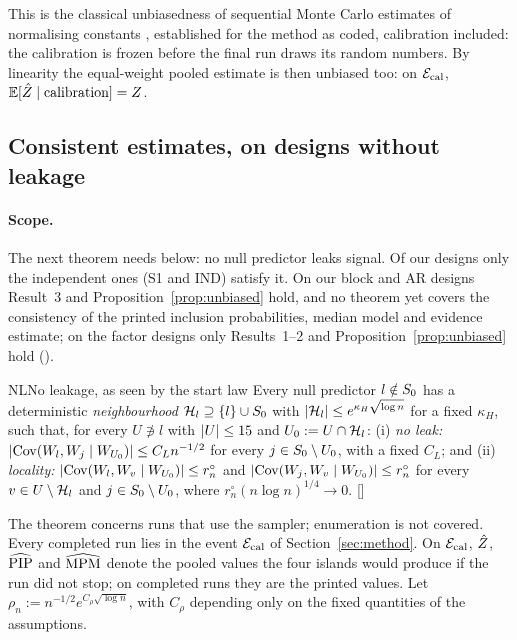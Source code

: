
This is the classical unbiasedness of sequential Monte Carlo estimates of normalising constants \citep{DelMoral2004},
established for the method as coded, calibration included: the calibration is frozen before the final run draws its
random numbers. By linearity the equal-weight pooled estimate is then unbiased too: on $\mathcal E_{\mathrm{cal}}$,
$\operatorname{\mathbb{E}}[\hat Z\mid\text{calibration}]=Z$.


\subsection{Consistent estimates, on designs without leakage}\label{sec:outputs}

\paragraph{Scope.} The next theorem needs  below: no null predictor leaks signal. Of our designs only the
independent ones (S1 and IND) satisfy it. On our block and AR designs Result~3 and Proposition~\ref{prop:unbiased} hold,
and no theorem yet covers the consistency of the printed inclusion probabilities, median model and evidence estimate; on the factor designs
only Results~1--2 and Proposition~\ref{prop:unbiased} hold ().

\begin{assumption}{NL}{No leakage, as seen by the start law}
Every null predictor $l\notin S_0$ has a deterministic \emph{neighbourhood} $\mathcal H_l\supseteq\{l\}\cup S_0$ with
$\lvert \mathcal H_l\rvert\le e^{\kappa_H\sqrt{\log n}}$ for a fixed $\kappa_H$, such that, for every $U\not\ni l$ with $\lvert U\rvert\le15$ and
$U_0:=U\cap\mathcal H_l$: (i) \emph{no leak:} $\lvert \operatorname{Cov}(W_l,W_j\mid W_{U_0})\rvert\le C_Ln^{-1/2}$ for every $j\in S_0\setminus U_0$,
with a fixed $C_L$; and (ii) \emph{locality:} $\lvert \operatorname{Cov}(W_l,W_v\mid W_{U_0})\rvert\le r^\circ_n$ and
$\lvert \operatorname{Cov}(W_j,W_v\mid W_{U_0})\rvert\le r^\circ_n$ for every $v\in U\setminus\mathcal H_l$ and $j\in S_0\setminus U_0$, where
$r^\circ_n(n\log n)^{1/4}\to0$. \hfill []
\end{assumption}

The theorem concerns runs that use the sampler; enumeration is not covered. Every completed run lies in the event
$\mathcal E_{\mathrm{cal}}$ of Section~\ref{sec:method}. On $\mathcal E_{\mathrm{cal}}$, $\hat Z$, $\widehat{\mathrm{PIP}}$ and
$\widehat{\mathrm{MPM}}$ denote the pooled values the four islands would produce if the run did not stop; on completed runs they
are the printed values. Let $\rho_n:=n^{-1/2}e^{C_\rho\sqrt{\log n}}$, with $C_\rho$ depending only on the fixed quantities of the
assumptions.

